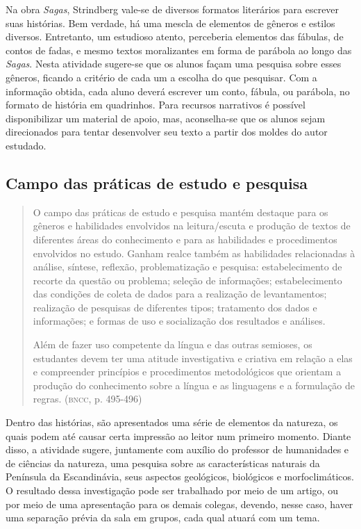\documentclass{extarticle}
\begin{document}
Na obra \emph{Sagas}, Strindberg vale-se de diversos formatos
literários para escrever suas histórias. Bem verdade, há uma mescla de
elementos de gêneros e estilos diversos. Entretanto, um estudioso
atento, perceberia elementos das fábulas, de contos de fadas, e mesmo
textos moralizantes em forma de parábola ao longo das \emph{Sagas}.
Nesta atividade sugere-se que os alunos façam uma pesquisa sobre esses
gêneros, ficando a critério de cada um a escolha do que pesquisar. Com
a informação obtida, cada aluno deverá escrever um conto, fábula, ou
parábola, no formato de história em quadrinhos. Para recursos
narrativos é possível disponibilizar um material de apoio, mas,
aconselha-se que os alunos sejam direcionados para tentar desenvolver
seu texto a partir dos moldes do autor estudado.

\subsection{Campo das práticas de estudo e pesquisa}

\begin{quote}
O campo das práticas de estudo e pesquisa mantém destaque para os
gêneros e habilidades envolvidos na leitura/escuta e produção de textos
de diferentes áreas do conhecimento e para as habilidades e
procedimentos envolvidos no estudo. Ganham realce também as habilidades
relacionadas à análise, síntese, reflexão, problematização e pesquisa:
estabelecimento de recorte da questão ou problema; seleção de
informações; estabelecimento das condições de coleta de dados para a
realização de levantamentos; realização de pesquisas de diferentes
tipos; tratamento dos dados e informações; e formas de uso e
socialização dos resultados e análises.

Além de fazer uso competente da língua e das outras semioses, os
estudantes devem ter uma atitude investigativa e criativa em relação a
elas e compreender princípios e procedimentos metodológicos que orientam
a produção do conhecimento sobre a língua e as linguagens e a formulação
de regras. (\textsc{bncc}, p. 495-496)
\end{quote}

Dentro das histórias, são apresentados uma série de elementos da
natureza, os quais podem até causar certa impressão ao leitor num
primeiro momento. Diante disso, a atividade sugere, juntamente com
auxílio do professor de humanidades e de ciências da natureza, uma
pesquisa sobre as características naturais da Península da
Escandinávia, seus aspectos geológicos, biológicos e morfoclimáticos.
O resultado dessa investigação pode ser trabalhado por meio de um
artigo, ou por meio de uma apresentação para os demais colegas,
devendo, nesse caso, haver uma separação prévia da sala em grupos,
cada qual atuará com um tema.
\end{document}
